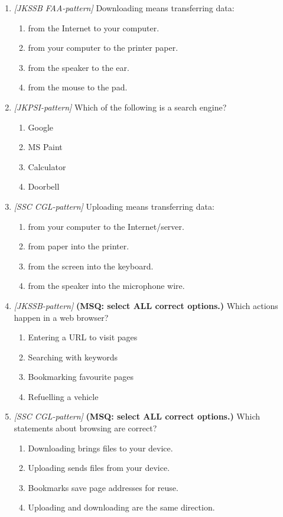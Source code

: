 \documentclass[11pt]{article}
\begin{document}
\begin{enumerate}[label=\textbf{Q\arabic*.}, leftmargin=*]
\item \textit{[JKSSB FAA-pattern]} Downloading means transferring data:
  \begin{enumerate}[label=\Alph*.]
    \item from the Internet to your computer.
    \item from your computer to the printer paper.
    \item from the speaker to the ear.
    \item from the mouse to the pad.
  \end{enumerate}
\item \textit{[JKPSI-pattern]} Which of the following is a search engine?
  \begin{enumerate}[label=\Alph*.]
    \item Google
    \item MS Paint
    \item Calculator
    \item Doorbell
  \end{enumerate}
\item \textit{[SSC CGL-pattern]} Uploading means transferring data:
  \begin{enumerate}[label=\Alph*.]
    \item from your computer to the Internet/server.
    \item from paper into the printer.
    \item from the screen into the keyboard.
    \item from the speaker into the microphone wire.
  \end{enumerate}
\item \textit{[JKSSB-pattern]} \textbf{(MSQ: select ALL correct options.)} Which actions happen in a web browser?
  \begin{enumerate}[label=\Alph*.]
    \item Entering a URL to visit pages
    \item Searching with keywords
    \item Bookmarking favourite pages
    \item Refuelling a vehicle
  \end{enumerate}
\item \textit{[SSC CGL-pattern]} \textbf{(MSQ: select ALL correct options.)} Which statements about browsing are correct?
  \begin{enumerate}[label=\Alph*.]
    \item Downloading brings files to your device.
    \item Uploading sends files from your device.
    \item Bookmarks save page addresses for reuse.
    \item Uploading and downloading are the same direction.
  \end{enumerate}
\end{enumerate}
\def\JKSSBLessonID{36}\def\JKSSBAnswers{0}
\end{document}

